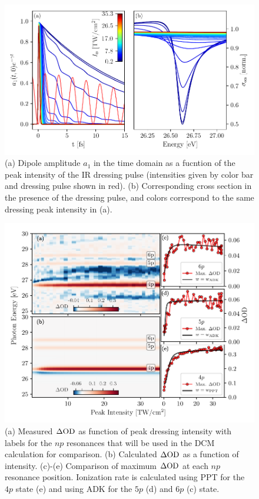 \begin{figure}
	\centering
	\includegraphics[width=1.0\textwidth]{figures/ATS/a1_t.pdf}
	\caption[Dipole amplitude in time domain and absorption cross section calculated using DCM using LIA.]{(a) Dipole amplitude $a_1$ in the time domain as a fucntion of the peak intensity of the IR dressing pulse (intensities given by color bar and dressing pulse shown in red). (b) Corresponding cross section in the presence of the dressing pulse, and colors correspond to the same dressing peak intensity in (a).}
	\label{fig:a1_t_intensity}
\end{figure}

\begin{figure}
	\centering
	\includegraphics[width=1.0\textwidth]{figures/ATS/np_intensity_dep.pdf}
	\caption[Comparison of measured $\dod$ to calculated $\dod$ using DCM with LIA.]{(a) Measured $\dod$ as function of peak dressing intensity with labels for the $np$ resonances that will be used in the DCM calculation for comparison. (b) Calculated $\dod$ as a function of intensity. (c)-(e) Comparison of maximum $\dod$ at each $np$ resonance position.  Ionization rate is calculated using PPT for the $4p$ state (e) and using ADK for the $5p$ (d) and $6p$ (c) state.}
	\label{fig:np_intensity_dep}
\end{figure}

